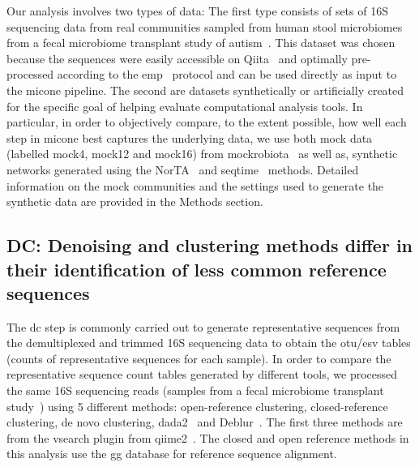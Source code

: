   Our analysis involves two types of data: The first type consists of sets of 16S sequencing data from real communities sampled from human stool microbiomes from a fecal microbiome transplant study of autism~\cite{Kang2017}.
  This dataset was chosen because the sequences were easily accessible on Qiita~\cite{qiita} and optimally pre-processed according to the \ac{emp}~\cite{Thompson2017} protocol and can be used directly as input to the \ac{micone} pipeline.
  The second are datasets synthetically or artificially created for the specific goal of helping evaluate computational analysis tools.
  In particular, in order to objectively compare, to the extent possible, how well each step in \ac{micone} best captures the underlying data, we use both mock data (labelled mock4, mock12 and mock16) from mockrobiota~\cite{Bokulich2016} as well as, synthetic networks generated using the NorTA~\cite{Kurtz2015} and seqtime~\cite{Rottjers2018} methods.
  Detailed information on the mock communities and the settings used to generate the synthetic data are provided in the Methods section.

  \FloatBarrier

  \subsection*{DC: Denoising and clustering methods differ in their identification of less common reference sequences}

  The \ac{dc} step is commonly carried out to generate representative sequences from the demultiplexed and trimmed 16S sequencing data to obtain the \ac{otu}/\ac{esv} tables (counts of representative sequences for each sample).
  In order to compare the representative sequence count tables generated by different tools, we processed the same 16S sequencing reads (samples from a fecal microbiome transplant study~\cite{Kang2017}) using 5 different methods: open-reference clustering, closed-reference clustering, de novo clustering, \ac{dada2}~\cite{Callahan2016} and Deblur~\cite{Amir2017}.
  The first three methods are from the vsearch plugin from \ac{qiime2}~\cite{bolyenReproducibleInteractiveScalable2019}.
  The closed and open reference methods in this analysis use the \ac{gg} database for reference sequence alignment.


